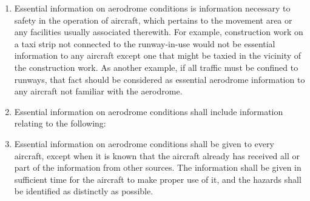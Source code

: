 \documentclass[../vATM.tex]{subfiles}
\begin{document}
    \begin{enumerate}[label=\arabic{section}.\arabic{subsection}.\arabic*]
        \item \label{7.5.1} Essential information on aerodrome conditions is information necessary to safety in the operation of aircraft, which pertains to the movement area or any facilities usually associated therewith. For example, construction work on a taxi strip not connected to the runway-in-use would not be essential information to any aircraft except one that might be taxied in the vicinity of the construction work. As another example, if all traffic must be confined to runways, that fact should be considered as essential aerodrome information to any aircraft not familiar with the aerodrome.
        \item \label{7.5.2} Essential information on aerodrome conditions shall include information relating to the following:



        \item Essential information on aerodrome conditions shall be given to every aircraft, except when it is known that the aircraft already has received all or part of the information from other sources. The information shall be given in sufficient time for the aircraft to make proper use of it, and the hazards shall be identified as distinctly as possible.


\end{enumerate}
\end{document}
